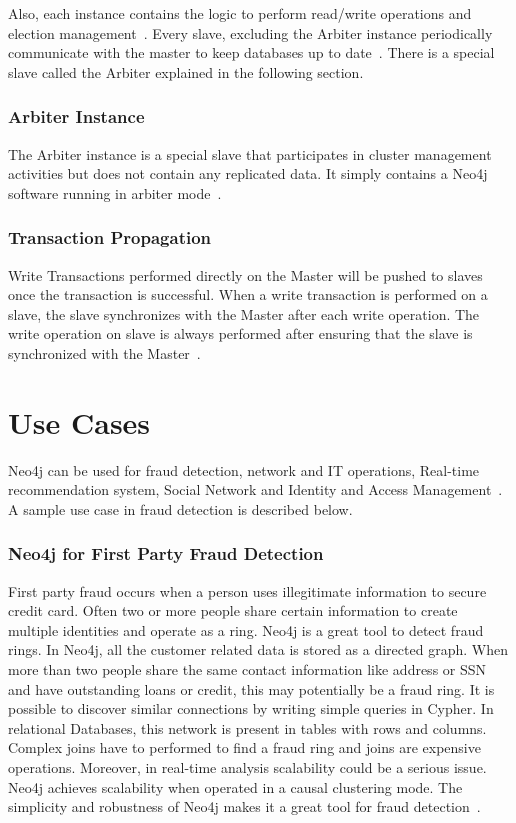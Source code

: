 \documentclass[9pt,twocolumn,twoside]{../../styles/osajnl}
\begin{document}
Also, each instance contains the logic to perform read/write operations and election management~\cite{www-neo4j-ha}. Every slave, excluding the Arbiter instance periodically communicate with the master to keep databases up to date~\cite{www-neo4j-ha}. There is a special slave called the Arbiter explained in the following section.
\subsubsection{Arbiter Instance}
The Arbiter instance is a special slave  that participates in cluster management activities but does not contain any replicated data. It simply contains a Neo4j software running in arbiter mode~\cite{www-neo4j-ha}. 
\subsubsection{Transaction Propagation}
Write Transactions performed directly on the Master will be pushed to slaves once the transaction is successful. When a write transaction is performed on a slave, the slave synchronizes with the Master after each write operation. The write operation on slave is always performed after ensuring that the slave is synchronized with the Master~\cite{www-neo4j-ha}.  

\section{Use Cases}
Neo4j can be used for fraud detection, network and IT operations, Real-time recommendation system, Social Network and Identity and Access Management~\cite{www-neo4j-uc}. A sample use case in fraud detection is described below. 

\subsubsection{Neo4j for First Party Fraud  Detection}
First party fraud occurs when a person uses illegitimate information to secure credit card. Often two or more people share certain information to create multiple identities and operate as a ring.  Neo4j is a great tool to detect fraud rings. In Neo4j, all the customer related data is stored as a directed graph. When more than two people share the same contact information like address or SSN and have outstanding loans or credit, this may potentially be a fraud ring. It is possible to discover similar connections by writing simple queries in Cypher. In relational Databases, this network is present in tables with rows and columns. Complex joins have to performed to find a fraud ring and joins are expensive operations. Moreover, in real-time analysis scalability could be a serious issue. Neo4j achieves scalability when operated in a causal clustering mode. The simplicity and robustness of Neo4j makes it a great tool for fraud detection~\cite{gorkasadowksi&philiprathle2015}.
\end{document}
